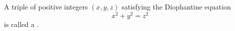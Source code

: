A triple of positive integers $(x, y, z)$ satisfying the Diophantine equation
$$x^2 + y^2 = z^2$$
is called a .
